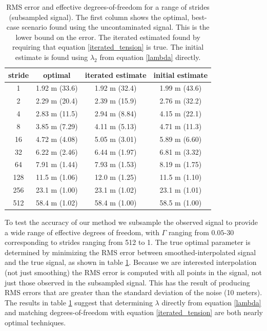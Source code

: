 \documentclass[10pt,journal]{IEEEtran}
\begin{document}
\begin{table}[ht]
\caption{RMS error and effective degrees-of-freedom for a range of strides (subsampled signal). The first column shows the optimal, best-case scenario found using the uncontaminated signal. This is the lower bound on the error. The iterated estimated found by requiring that equation \ref{iterated_tension} is true. The initial estimate is found using $\lambda_2$ from equation \ref{lambda} directly. }
\label{fit_results}
\centering
\begin{tabular}{c | ccc} stride & optimal & iterated estimate & initial estimate \\ \hline \hline 
1 & 1.92 m (33.6) &  1.92 m (32.4) &  1.99 m (43.6) \\ 
2 & 2.29 m (20.4) &  2.39 m (15.9) &  2.76 m (32.2) \\ 
4 & 2.83 m (11.5) &  2.94 m (8.84) &  4.15 m (22.1) \\ 
8 & 3.85 m (7.29) &  4.11 m (5.13) &  4.71 m (11.3) \\ 
16 & 4.72 m (4.08) &  5.05 m (3.01) &  5.89 m (6.60) \\ 
32 & 6.22 m (2.46) &  6.44 m (1.97) &  6.81 m (3.32) \\ 
64 & 7.91 m (1.44) &  7.93 m (1.53) &  8.19 m (1.75) \\ 
128 & 11.5 m (1.06) &  12.0 m (1.25) &  11.5 m (1.10) \\ 
256 & 23.1 m (1.00) &  23.1 m (1.02) &  23.1 m (1.01) \\ 
512 & 58.4 m (1.02) &  58.4 m (1.00) &  58.5 m (1.00) \\ 
\end{tabular} 

\end{table}




To test the accuracy of our method we subsample the observed signal to provide a wide range of effective degrees of freedom, with $\Gamma$ ranging from $0.05$-$30$ corresponding to strides ranging from 512 to 1. The true optimal parameter is determined by minimizing the RMS error between smoothed-interpolated signal and the true signal, as shown in table \ref{fit_results}. Because we are interested interpolation (not just smoothing) the RMS error is computed with all points in the signal, not just those observed in the subsampled signal. This has the result of producing RMS errors that are greater than the standard deviation of the noise (10 meters). The results in table \ref{fit_results} suggest that determining $\lambda$ directly from equation \ref{lambda} and matching degrees-of-freedom with equation \ref{iterated_tension} are both nearly optimal techniques.
\end{document}
